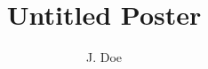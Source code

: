 \documentclass[dvipdfmx]{beamer}
\title{Untitled Poster}
\author{J. Doe}
\begin{document}
\begin{frame}
\begin{columns}[t]
    \begin{column}{0.48\linewidth}
        
        
        
    \end{column}
    \begin{column}{0.48\linewidth}
        
    \end{column}
\end{columns}
\end{frame}
\end{document}
